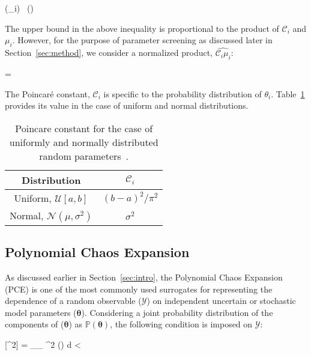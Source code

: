 \be
{}(\theta_i) \leq {}~(\propto {})
\label{eq:bound}
\ee

\noindent The upper bound in the above inequality is proportional to the product of $\mathcal{C}_i$
and $\mu_i$. However, for the purpose of parameter screening as discussed later in
Section~\ref{sec:method}, we consider a normalized product, $\hat{\mathcal{C}_i\mu_i}$:

\be
{} = 
\label{eq:cmu}
\ee

\noindent The Poincar\'e constant, $\mathcal{C}_i$ is specific to the probability distribution of $\theta_i$.
Table~\ref{tab:poincare} provides its value in the case of uniform and normal
distributions.
\bigskip

\begin{table}[htbp]
\renewcommand*{\arraystretch}{1.2}
\begin{center}
\begin{tabular}{|c|c|}
\hline
Distribution & $\mathcal{C}_i$ \\ \hline \hline 
Uniform, $\mathcal{U}[a, b]$ & $(b-a)^{2}/\pi^2$ \\ 
Normal, $\mathcal{N}(\mu,\sigma^2)$ & $\sigma^2$ \\ 
\hline
\end{tabular}
\end{center}

\caption{Poincare constant for the case of uniformly and normally distributed random
parameters~\cite{Roustant:2014}.}
\label{tab:poincare}
\end{table}

\subsection{Polynomial Chaos Expansion}

As discussed earlier in Section~\ref{sec:intro}, the Polynomial Chaos Expansion (PCE)
is one of the most commonly used surrogates for representing the dependence of a random
observable ($\mathcal{Y}$) on independent uncertain or stochastic model parameters ($\bm{\theta}$).
Considering a joint probability distribution of the components of ($\bm{\theta}$) as $\mathbb{P}(\bm{\theta})$,
the following condition is imposed on $\mathcal{Y}$:

\be
{}[^2] = \int_{_{\bm{\theta}}} ^2 (\bm{\theta}) 
d\bm{\theta} < \infty
\ee

